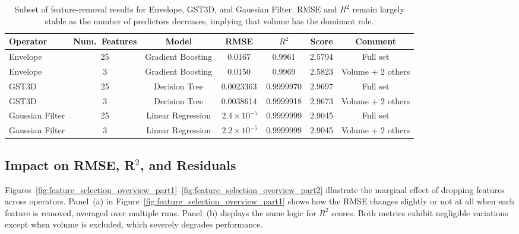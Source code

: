 \begin{table}[htbp]
    \centering
    \begin{tabular}{lcccccc}
        \hline
        \textbf{Operator} & \textbf{Num.\ Features} & \textbf{Model}    & \textbf{\ac{RMSE}}       & \textbf{$R^2$} & \textbf{Score} & \textbf{Comment} \\
        \hline
        Envelope          & 25                      & Gradient Boosting & 0.0167                   & 0.9961         & 2.5794         & Full set          \\
        Envelope          & 3                       & Gradient Boosting & 0.0150                   & 0.9969         & 2.5823         & Volume + 2 others \\
        \hline
        \ac{GST3D}        & 25                      & Decision Tree     & 0.0023363                & 0.9999970      & 2.9697         & Full set          \\
        \ac{GST3D}        & 3                       & Decision Tree     & 0.0038614                & 0.9999918      & 2.9673         & Volume + 2 others \\
        \hline
        Gaussian Filter   & 25                      & Linear Regression & \(\,2.4 \times 10^{-5}\) & 0.9999999      & 2.9045         & Full set          \\
        Gaussian Filter   & 3                       & Linear Regression & \(\,2.2 \times 10^{-5}\) & 0.9999999      & 2.9045         & Volume + 2 others \\
        \hline
    \end{tabular}
    \caption{Subset of feature-removal results for Envelope, \ac{GST3D}, and Gaussian Filter.
    \ac{RMSE} and $R^2$ remain largely stable as the number of predictors decreases, implying that volume has the dominant role.}
    \label{tab:feature_selection_minimal_impact}
\end{table}

\subsection{Impact on RMSE, R\texorpdfstring{$^2$}{2}, and Residuals}
\label{subsec:impact-on-rmse-r2-and-residuals}

Figures~\ref{fig:feature_selection_overview_part1}--\ref{fig:feature_selection_overview_part2} illustrate the marginal effect of dropping features across operators.
Panel~(a) in Figure~\ref{fig:feature_selection_overview_part1} shows how the \ac{RMSE} changes slightly or not at all when each feature is removed, averaged over multiple runs.
Panel~(b) displays the same logic for $R^2$ scores.
Both metrics exhibit negligible variations except when volume is excluded, which severely degrades performance.

